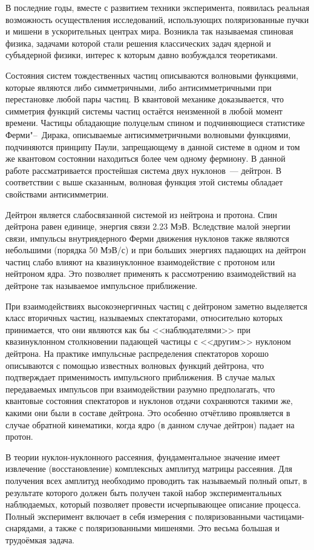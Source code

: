 \intro
В последние годы, вместе с развитием техники эксперимента, появилась реальная
возможность осуществления исследований, использующих поляризованные пучки и
мишени в ускорительных центрах мира. Возникла так называемая спиновая физика,
задачами которой стали решения классических задач ядерной и субъядерной физики,
интерес к которым давно возбуждался теоретиками.

Состояния систем тождественных частиц описываются волновыми функциями, которые
являются либо симметричными, либо антисимметричными при перестановке любой пары
частиц. В квантовой механике доказывается, что симметрия функций системы частиц
остаётся неизменной в любой момент времени. Частицы обладающие полуцелым спином
и подчиняющиеся статистике Ферми"--~Дирака, описываемые антисимметричными
волновыми функциями, подчиняются принципу Паули, запрещающему в данной системе в
одном и том же квантовом состоянии находиться более чем одному фермиону. В
данной работе рассматривается простейшая система двух нуклонов~--- дейтрон. В
соответствии с выше сказанным, волновая функция этой системы обладает свойствами
антисимметрии.

Дейтрон является слабосвязанной системой из нейтрона и протона. Спин дейтрона
равен единице, энергия связи 2.23 МэВ. Вследствие малой энергии связи, импульсы
внутриядерного Ферми движения нуклонов также являются небольшими (порядка 50
МэВ/с) и при больших энергиях падающих на дейтрон частиц слабо влияют на
квазинуклонное взаимодействие с протоном или нейтроном ядра. Это позволяет
применять к рассмотрению взаимодействий на дейтроне так называемое импульсное
приближение.

При взаимодействиях высокоэнергичных частиц с дейтроном заметно выделяется класс
вторичных частиц, называемых спектаторами, относительно которых принимается, что
они являются как бы <<наблюдателями>> при квазинуклонном столкновении падающей
частицы с <<другим>> нуклоном дейтрона. На практике импульсные распределения
спектаторов хорошо описываются с помощью известных волновых функций дейтрона,
что подтверждает применимость импульсного приближения. В случае малых
передаваемых импульсов при взаимодействии разумно предполагать, что квантовые
состояния спектаторов и нуклонов отдачи сохраняются такими же, какими они были
в составе дейтрона. Это особенно отчётливо проявляется в случае обратной
кинематики, когда ядро (в данном случае дейтрон) падает на протон.

В теории нуклон-нуклонного рассеяния, фундаментальное значение имеет извлечение
(восстановление) комплексных амплитуд матрицы рассеяния. Для получения всех
амплитуд необходимо проводить так называемый полный опыт, в результате которого
должен быть получен такой набор экспериментальных наблюдаемых, который позволяет
провести исчерпывающее описание процесса. Полный эксперимент включает в себя
измерения с поляризованными частицами-снарядами, а также с поляризованными
мишенями. Это весьма большая и трудоёмкая задача.

